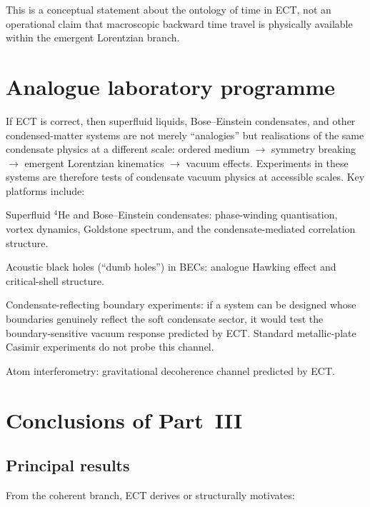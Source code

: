 \documentclass[11pt,a4paper]{article}
\begin{document}
This is a conceptual statement about the ontology of time in ECT, not an operational claim that macroscopic backward time travel is physically available within the emergent Lorentzian branch.


\section{Analogue laboratory programme}

If ECT is correct, then superfluid liquids, Bose--Einstein condensates, and other condensed-matter systems are not merely ``analogies'' but realisations of the same condensate physics at a different scale: ordered medium $\to$ symmetry breaking $\to$ emergent Lorentzian kinematics $\to$ vacuum effects. Experiments in these systems are therefore tests of condensate vacuum physics at accessible scales. Key platforms include:

Superfluid $^4$He and Bose--Einstein condensates: phase-winding quantisation, vortex dynamics, Goldstone spectrum, and the condensate-mediated correlation structure.

Acoustic black holes (``dumb holes'') in BECs: analogue Hawking effect and critical-shell structure.

Condensate-reflecting boundary experiments: if a system can be designed whose boundaries genuinely reflect the soft condensate sector, it would test the boundary-sensitive vacuum response predicted by ECT. Standard metallic-plate Casimir experiments do not probe this channel.

Atom interferometry: gravitational decoherence channel predicted by ECT.


\section{Conclusions of Part~III}

\subsection{Principal results}

From the coherent branch, ECT derives or structurally motivates:
\end{document}
